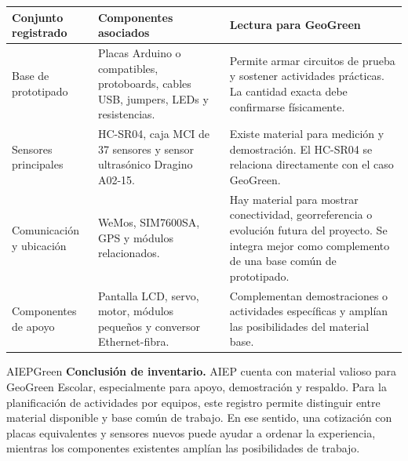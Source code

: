 \documentclass[11pt,a4paper]{article}
\begin{document}
\begin{tabularx}{\linewidth}{L{3.4cm}Y Y}
\textbf{Conjunto registrado} & \textbf{Componentes asociados} & \textbf{Lectura para GeoGreen} \\
\hline
Base de prototipado & Placas Arduino o compatibles, protoboards, cables USB, jumpers, LEDs y resistencias. & Permite armar circuitos de prueba y sostener actividades prácticas. La cantidad exacta debe confirmarse físicamente. \\
Sensores principales & HC-SR04, caja MCI de 37 sensores y sensor ultrasónico Dragino A02-15. & Existe material para medición y demostración. El HC-SR04 se relaciona directamente con el caso GeoGreen. \\
Comunicación y ubicación & WeMos, SIM7600SA, GPS y módulos relacionados. & Hay material para mostrar conectividad, georreferencia o evolución futura del proyecto. Se integra mejor como complemento de una base común de prototipado. \\
Componentes de apoyo & Pantalla LCD, servo, motor, módulos pequeños y conversor Ethernet-fibra. & Complementan demostraciones o actividades específicas y amplían las posibilidades del material base. \\
\end{tabularx}

\begin{infobox}{AIEPGreen}
\textbf{Conclusión de inventario.} AIEP cuenta con material valioso para GeoGreen Escolar, especialmente para apoyo, demostración y respaldo. Para la planificación de actividades por equipos, este registro permite distinguir entre material disponible y base común de trabajo. En ese sentido, una cotización con placas equivalentes y sensores nuevos puede ayudar a ordenar la experiencia, mientras los componentes existentes amplían las posibilidades de trabajo.
\end{infobox}
\end{document}
